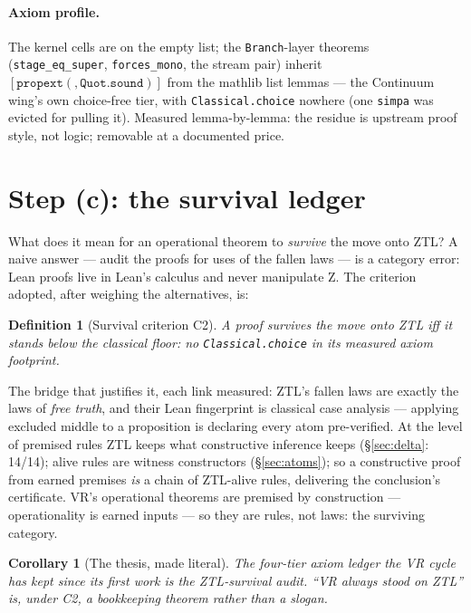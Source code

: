\documentclass[11pt]{article}
\newtheorem{defn}[thm]{Definition}
\newtheorem{cor}[thm]{Corollary}
\theoremstyle{remark}
\newcommand{\vZ}{\textsf{Z}}
\begin{document}
\paragraph{Axiom profile.} The kernel cells are on the empty list; the
\texttt{Branch}-layer theorems (\texttt{stage\_eq\_super},
\texttt{forces\_mono}, the stream pair) inherit
$[\texttt{propext}(,\texttt{Quot.sound})]$ from the mathlib list lemmas ---
the Continuum wing's own choice-free tier, with \texttt{Classical.choice}
nowhere (one \texttt{simpa} was evicted for pulling it). Measured
lemma-by-lemma: the residue is upstream proof style, not logic; removable
at a documented price.

\section{Step (c): the survival ledger}
\label{sec:survival}

What does it mean for an operational theorem to \emph{survive} the move
onto ZTL? A naive answer --- audit the proofs for uses of the fallen laws
--- is a category error: Lean proofs live in Lean's calculus and never
manipulate \vZ{}. The criterion adopted, after weighing the
alternatives, is:

\begin{defn}[Survival criterion C2]
A proof survives the move onto ZTL iff it stands below the classical
floor: no \texttt{Classical.choice} in its measured axiom footprint.
\end{defn}

The bridge that justifies it, each link measured: ZTL's fallen laws are
exactly the laws of \emph{free truth}, and their Lean fingerprint is
classical case analysis --- applying excluded middle to a proposition is
declaring every atom pre-verified. At the level of premised rules ZTL keeps
what constructive inference keeps (\S\ref{sec:delta}: 14/14); alive rules
are witness constructors (\S\ref{sec:atoms}); so a constructive proof from
earned premises \emph{is} a chain of ZTL-alive rules, delivering the
conclusion's certificate. VR's operational theorems are premised by
construction --- operationality is earned inputs --- so they are rules, not
laws: the surviving category.

\begin{cor}[The thesis, made literal]
The four-tier axiom ledger the VR cycle has kept since its first work is
the ZTL-survival audit. ``VR always stood on ZTL'' is, under C2, a
bookkeeping theorem rather than a slogan.
\end{cor}
\end{document}
